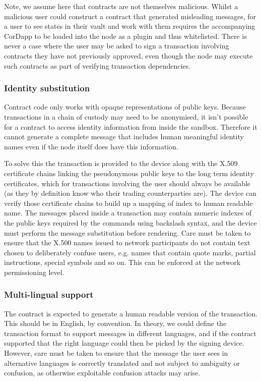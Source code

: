 \documentclass{article}
\begin{document}
Note, we assume here that contracts are not themselves malicious. Whilst a malicious user could construct a
contract that generated misleading messages, for a user to see states in their vault and work with them requires
the accompanying CorDapp to be loaded into the node as a plugin and thus whitelisted. There is never a case where
the user may be asked to sign a transaction involving contracts they have not previously approved, even though the
node may execute such contracts as part of verifying transaction dependencies.

\subsubsection{Identity substitution}

Contract code only works with opaque representations of public keys. Because transactions in a chain of custody may
need to be anonymised, it isn't possible for a contract to access identity information from inside the sandbox.
Therefore it cannot generate a complete message that includes human meaningful identity names even if the node
itself does have this information.

To solve this the transaction is provided to the device along with the X.509 certificate chains linking the
pseudonymous public keys to the long term identity certificates, which for transactions involving the user should
always be available (as they by definition know who their trading counterparties are). The device can verify those
certificate chains to build up a mapping of index to human readable name. The messages placed inside a transaction
may contain numeric indexes of the public keys required by the commands using backslash syntax, and the device must
perform the message substitution before rendering. Care must be taken to ensure that the X.500 names issued to
network participants do not contain text chosen to deliberately confuse users, e.g. names that contain quote marks,
partial instructions, special symbols and so on. This can be enforced at the network permissioning level.

\subsubsection{Multi-lingual support}

The contract is expected to generate a human readable version of the transaction. This should be in English, by
convention. In theory, we could define the transaction format to support messages in different languages, and if
the contract supported that the right language could then be picked by the signing device. However, care must be
taken to ensure that the message the user sees in alternative languages is correctly translated and not subject to
ambiguity or confusion, as otherwise exploitable confusion attacks may arise.
\end{document}
